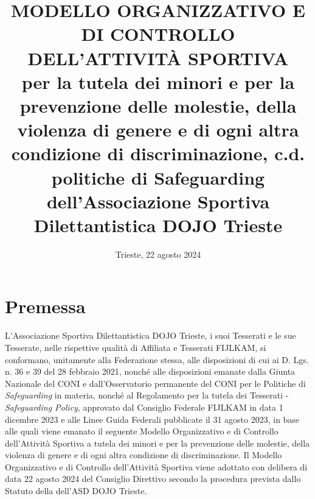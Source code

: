 \documentclass{djtsdoc}
\title{MODELLO ORGANIZZATIVO E DI CONTROLLO DELL'ATTIVITÀ SPORTIVA \\[10pt] {\normalfont\large per la tutela dei minori e per la prevenzione delle molestie, della violenza di genere e di ogni altra condizione di discriminazione, c.d. politiche di Safeguarding dell'Associazione Sportiva Dilettantistica DOJO Trieste}}
\date{Trieste, 22 agosto 2024}
\begin{document}
	\maketitle
	
	\section*{Premessa}
	L'Associazione Sportiva Dilettantistica DOJO Trieste, i suoi Tesserati e le sue Tesserate, nelle rispettive qualità di Affiliata e Tesserati FIJLKAM, si conformano, unitamente alla Federazione stessa, alle disposizioni di cui ai D. Lgs. n. 36 e 39 del 28 febbraio 2021, nonché alle disposizioni emanate dalla Giunta Nazionale del CONI e dall'Osservatorio permanente del CONI per le Politiche di \textit{Safeguarding} in materia, nonché al Regolamento per la tutela dei Tesserati - \textit{Safeguarding Policy}, approvato dal Consiglio Federale FIJLKAM in data 1 dicembre 2023 e alle Linee Guida Federali pubblicate il 31 agosto 2023, in base alle quali viene emanato il seguente Modello Organizzativo e di Controllo dell'Attività Sportiva  a tutela dei minori  e per la prevenzione delle molestie, della violenza di genere e di ogni altra condizione di discriminazione.
	Il Modello Organizzativo e di Controllo dell'Attività Sportiva viene adottato con delibera di data 22 agosto 2024 del Consiglio Direttivo secondo la procedura prevista dallo Statuto della dell'ASD DOJO Trieste.
	
\end{document}
